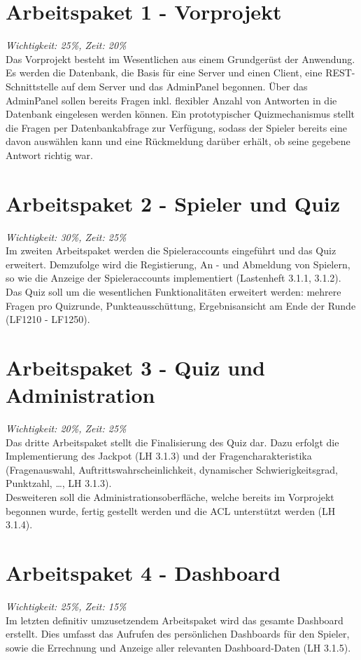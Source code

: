 \documentclass[11pt,a4paper]{scrreprt}
\begin{document}
\section{Arbeitspaket 1 - Vorprojekt} \textit{Wichtigkeit: 25\%, Zeit: 20\%} \\
Das Vorprojekt besteht im Wesentlichen aus einem Grundgerüst der Anwendung. Es werden die Datenbank, die Basis für eine Server und einen Client, eine REST-Schnittstelle auf dem Server und das AdminPanel begonnen. Über das AdminPanel sollen bereits Fragen inkl. flexibler Anzahl von Antworten in die Datenbank eingelesen werden können. Ein prototypischer Quizmechanismus stellt die Fragen per Datenbankabfrage zur Verfügung, sodass der Spieler bereits eine davon auswählen kann und eine Rückmeldung darüber erhält, ob seine gegebene Antwort richtig war.

\section{Arbeitspaket 2 - Spieler und Quiz} \textit{Wichtigkeit: 30\%, Zeit: 25\%} \\
Im zweiten Arbeitspaket werden die Spieleraccounts eingeführt und das Quiz erweitert. Demzufolge wird die Registierung, An - und Abmeldung von Spielern, so wie die Anzeige der Spieleraccounts implementiert (Lastenheft 3.1.1, 3.1.2). Das Quiz soll um die wesentlichen Funktionalitäten erweitert werden: mehrere Fragen pro Quizrunde, Punkteausschüttung, Ergebnisansicht am Ende der Runde (LF1210 - LF1250).

\section{Arbeitspaket 3 - Quiz und Administration} \textit{Wichtigkeit: 20\%, Zeit: 25\%} \\
Das dritte Arbeitspaket stellt die Finalisierung des Quiz dar. Dazu erfolgt die Implementierung des Jackpot (LH 3.1.3) und der Fragencharakteristika (Fragenauswahl, Auftrittswahrscheinlichkeit, dynamischer Schwierigkeitsgrad, Punktzahl, \dots, LH 3.1.3).\\
Desweiteren soll die Administrationsoberfläche, welche bereits im Vorprojekt begonnen wurde, fertig gestellt werden und die ACL unterstützt werden (LH 3.1.4).

\section{Arbeitspaket 4 - Dashboard} \textit{Wichtigkeit: 25\%, Zeit: 15\%} \\
Im letzten definitiv umzusetzendem Arbeitspaket wird das gesamte Dashboard erstellt. Dies umfasst das Aufrufen des persönlichen Dashboards für den Spieler, sowie die Errechnung und Anzeige aller relevanten Dashboard-Daten (LH 3.1.5).
\end{document}
